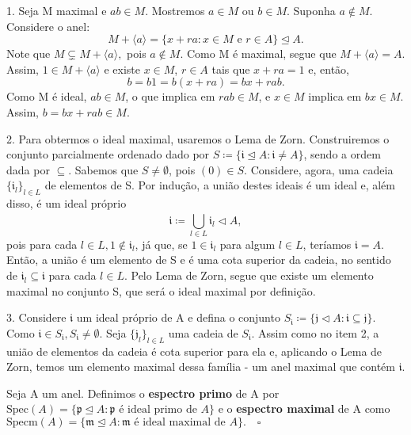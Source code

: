 \documentclass[algebraII_notes.tex]{subfiles}
\begin{document}
\begin{proof*}
	1. Seja M maximal e \(ab\in M.\) Mostremos \(a\in M\) ou \(b\in M\). Suponha
	\(a\not\in M\). Considere o anel:
	\[
		M + \langle a \rangle = \{x+ra: x\in M\text{ e }r\in A\} \trianglelefteq{A}.
	\]
	Note que \(M\subsetneq{M + \langle a \rangle},\) pois \(a\not\in M.\) Como M é maximal, segue que
	\(M + \langle a \rangle = A.\) Assim, \(1\in M + \langle a \rangle\) e existe \(x\in M\), \(r\in A\)
	tais que \(x + ra = 1\) e, então,
	\[
		b = b1 = b(x+ra) = bx + rab.
	\]
	Como M é ideal, \(ab\in M\), o que implica em \(rab\in M\), e \(x\in M\) implica em \(bx\in M\).
	Assim, \(b = bx + rab\in M\).

	2. Para obtermos o ideal maximal, usaremos o Lema de Zorn. Construiremos o conjunto parcialmente ordenado
	dado por \(S\coloneqq \{\mathfrak{i}\trianglelefteq{A}: \mathfrak{i}\neq A\}\), sendo a ordem dada por \(\subseteq{}.\)
	Sabemos que \(S \neq\emptyset\), pois \((0)\in S.\) Considere, agora, uma cadeia \(\{\mathfrak{i}_{l}\}_{l\in L}\) de elementos
	de S. Por indução, a união destes ideais é um ideal e, além disso, é um ideal próprio
	\[
		\mathfrak{i}\coloneqq \bigcup_{l\in L}^{}{\mathfrak{i}_{l}}\vartriangleleft{A},
	\]
	pois para cada \(l\in L, 1\not\in \mathfrak{i}_{l}\), já que, se \(1\in \mathfrak{i}_{l}\) para algum \(l\in L\), teríamos
	\(\mathfrak{i} = A\). Então, a união é um elemento de S e é uma cota superior da cadeia, no sentido de \(\mathfrak{i}_{l}\subseteq{\mathfrak{i}}\)
	para cada \(l\in L.\) Pelo Lema de Zorn, segue que existe um elemento maximal no conjunto S, que será o ideal maximal por definição.

	3. Considere \(\mathfrak{i}\) um ideal próprio de A e defina o conjunto \(S_{\mathfrak{i}}\coloneqq \{\mathfrak{j}\vartriangleleft{A}:\mathfrak{i}\subseteq{\mathfrak{j}}\}\).
	Como \(\mathfrak{i}\in S_{\mathfrak{i}}, S_{\mathfrak{i}}\neq\emptyset.\) Seja \(\{\mathfrak{j}_{l}\}_{l\in L}\) uma cadeia de \(S_{\mathfrak{i}}.\)
	Assim como no item 2, a união de elementos da cadeia é cota superior para ela e, aplicando o Lema de Zorn, temos um elemento
	maximal dessa família - um anel maximal que contém \(\mathfrak{i}.\)
	\qedsymbol
\end{proof*}
\begin{def*}
	Seja A um anel. Definimos o \textbf{espectro primo} de A por \(\mathrm{Spec}(A) = \{\mathfrak{p}\trianglelefteq{A}: \mathfrak{p}\text{ é ideal primo de } A\}\)
	e o \textbf{espectro maximal} de A como \(\mathrm{Specm}(A) = \{\mathfrak{m}\trianglelefteq{A}:\mathfrak{m} \text{ é ideal maximal de } A\}.\quad\square\)
\end{def*}
\end{document}
